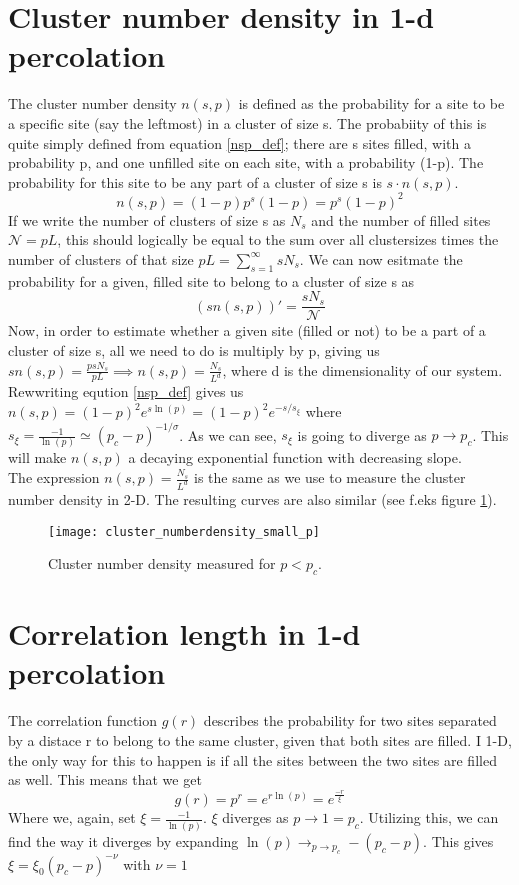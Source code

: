 \documentclass[a4paper,english, 10pt, twoside]{article}
\begin{document}
\section{Cluster number density in 1-d percolation}\label{section_12}
The cluster number density $n(s,p)$ is defined as the probability for a site to be a specific site (say the leftmost) in a cluster 
of size s. The probabiity of this is quite simply defined from equation \ref{nsp_def}; there are s sites filled, with a probability 
p, and one unfilled site on each site, with a probability (1-p). The probability for this site to be any part of a cluster of size s 
is $s\cdot n(s,p)$.
\begin{equation}\label{nsp_def}
 n(s,p) = (1-p)p^s(1-p) = p^s(1-p)^2
\end{equation}
If we write the number of clusters of size s as $N_s$ and the number of filled sites $\mathcal{N} = pL$, this should logically be 
equal to the sum over all clustersizes times the number of clusters of that size $pL = \sum\limits_{s=1}^\infty sN_s$. We can now 
esitmate the probability for a given, filled site to belong to a cluster of size s as 
\begin{equation*}
 (sn(s,p))' = \frac{sN_s}{\mathcal{N}}
\end{equation*}
Now, in order to estimate whether a given site (filled or not) to be a part of a cluster of size s, all we need to do is multiply 
by p, giving us $sn(s,p) = \frac{psN_s}{pL} \implies n(s,p) = \frac{N_s}{L^d}$, where d is the dimensionality of our system.\\
Rewwriting eqution \ref{nsp_def} gives us $n(s,p) = (1-p)^2e^{s\ln(p)} = (1-p)^2e^{-s/s_\xi}$ where $s_\xi = \frac{-1}{\ln(p)} 
\simeq (p_c -p)^{-1/\sigma}$. As we can see, $s_\xi$ is going to diverge as $p\to p_c$. This will make $n(s,p)$ a decaying exponential 
function with decreasing slope.\\
The expression $n(s,p) = \frac{N_s}{L^d}$ is the same as we use to measure the cluster number density in 2-D. The resulting curves 
are also similar (see f.eks figure \ref{nsp}).
\begin{figure}[H]
\centering
\texttt{[image: cluster\_numberdensity\_small\_p]}
\caption{Cluster number density measured for $p<p_c$.}
\label{nsp}
\end{figure}

\section{Correlation length in 1-d percolation}
The correlation function $g(r)$ describes the probability for two sites separated by a distace r to belong to the same cluster, given 
that both sites are filled. I 1-D, the only way for this to happen is if all the sites between the two sites are filled as well. This 
means that we get 
\begin{equation}
g(r) = p^r = e^{r\ln(p)} = e^{\frac{-r}{\xi}}
\end{equation}
Where we, again, set $\xi = \frac{-1}{\ln(p)}$. $\xi$ diverges as $p\to 1=p_c$. Utilizing this, we can find the way it diverges by 
expanding $\ln(p) \to_{p\to p_c} -(p_c-p)$. This gives $\xi = \xi_0(p_c-p)^{-\nu}$ with $\nu = 1$
\end{document}
